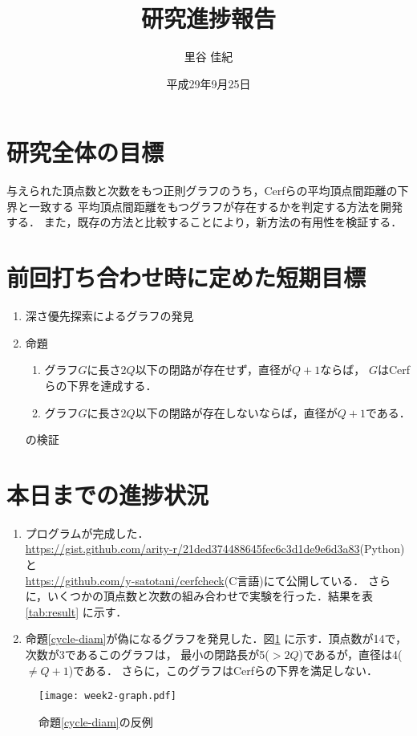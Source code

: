 \documentclass[11pt]{jarticle}
\title{研究進捗報告}
\author{里谷 佳紀}
\date{平成29年9月25日}
\begin{document}
%
\maketitle
\thispagestyle{empty}
%
\section{研究全体の目標}
与えられた頂点数と次数をもつ正則グラフのうち，Cerfらの平均頂点間距離の下界\cite{Cerf1974}と一致する
平均頂点間距離をもつグラフが存在するかを判定する方法を開発する．
また，既存の方法\cite{Yamamoto2016}と比較することにより，新方法の有用性を検証する．

\section{前回打ち合わせ時に定めた短期目標}
\begin{enumerate}
\item 深さ優先探索によるグラフの発見
\item 命題
  \begin{enumerate}
  \item グラフ$G$に長さ$2Q$以下の閉路が存在せず，直径が$Q+1$ならば，
    $G$はCerfらの下界を達成する．
  \item \label{cycle-diam}
    グラフ$G$に長さ$2Q$以下の閉路が存在しないならば，直径が$Q+1$である．
  \end{enumerate}
  の検証
\end{enumerate}

\section{本日までの進捗状況}
\begin{enumerate}
\item プログラムが完成した．\\
  \url{https://gist.github.com/arity-r/21ded374488645fec6c3d1de9e6d3a83}(Python)と\\
  \url{https://github.com/y-satotani/cerfcheck}(C言語)にて公開している．
  さらに，いくつかの頂点数と次数の組み合わせで実験を行った．結果を表\ref{tab:result}
  に示す．
\item 命題\ref{cycle-diam}が偽になるグラフを発見した．図\ref{fig:cycle-diam}
  に示す．頂点数が14で，次数が3であるこのグラフは，
  最小の閉路長が5($>2Q$)であるが，直径は4($\neq Q+1$)である．
  さらに，このグラフはCerfらの下界を満足しない．
\end{enumerate}



\begin{figure}[H]
  \centering
  \texttt{[image: week2-graph.pdf]}
  \caption{命題\ref{cycle-diam}の反例}
  \label{fig:cycle-diam}
\end{figure}



\end{document}
